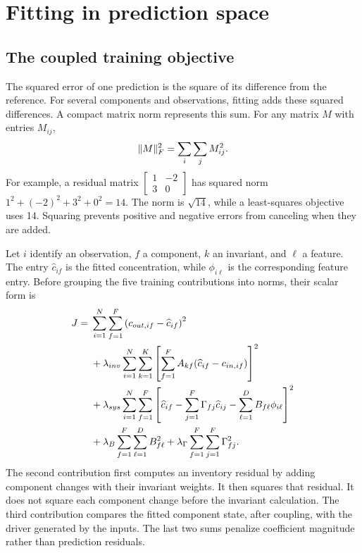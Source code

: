 \section{Fitting in prediction space}

\subsection{The coupled training objective}

The squared error of one prediction is the square of its difference from the reference. For several components and observations, fitting adds these squared differences. A compact matrix norm represents this sum. For any matrix \(M\) with entries \(M_{ij}\),
\begin{equation}
\equationname{Squared Frobenius norm as a sum of coefficient squares}
\label{eq:icsor_frobenius_definition}
\|M\|_F^2=\sum_i\sum_j M_{ij}^2.
\end{equation}
For example, a residual matrix \(\begin{bmatrix}1&-2\\3&0\end{bmatrix}\) has squared norm \(1^2+(-2)^2+3^2+0^2=14\). The norm is \(\sqrt{14}\), while a least-squares objective uses 14. Squaring prevents positive and negative errors from canceling when they are added.

Let \(i\) identify an observation, \(f\) a component, \(k\) an invariant, and \(\ell\) a feature. The entry \(\widehat c_{if}\) is the fitted concentration, while \(\phi_{i\ell}\) is the corresponding feature entry. Before grouping the five training contributions into norms, their scalar form is
\begin{equation}
\equationname{Scalar expansion of the structured-regression training objective}
\label{eq:icsor_training_scalar}
\begin{aligned}
J={}&\sum_{i=1}^{N}\sum_{f=1}^{F}
\left(c_{out,if}-\widehat c_{if}\right)^2\\
&+\lambda_{inv}\sum_{i=1}^{N}\sum_{k=1}^{K}
\left[\sum_{f=1}^{F}A_{kf}(\widehat c_{if}-c_{in,if})\right]^2\\
&+\lambda_{sys}\sum_{i=1}^{N}\sum_{f=1}^{F}
\left[\widehat c_{if}-\sum_{j=1}^{F}\Gamma_{fj}\widehat c_{ij}
-\sum_{\ell=1}^{D}B_{f\ell}\phi_{i\ell}\right]^2\\
&+\lambda_B\sum_{f=1}^{F}\sum_{\ell=1}^{D}B_{f\ell}^2
+\lambda_{\Gamma}\sum_{f=1}^{F}\sum_{j=1}^{F}\Gamma_{fj}^2.
\end{aligned}
\end{equation}
The second contribution first computes an inventory residual by adding component changes with their invariant weights. It then squares that residual. It does not square each component change before the invariant calculation. The third contribution compares the fitted component state, after coupling, with the driver generated by the inputs. The last two sums penalize coefficient magnitude rather than prediction residuals.

